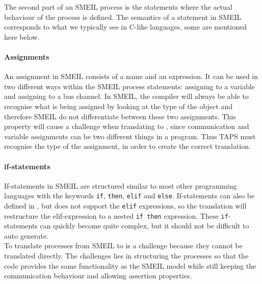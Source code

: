 The second part of an SMEIL process is the statements where the actual behaviour of the process is defined. The semantics of a statement in SMEIL corresponds to what we typically see in C-like languages, some are mentioned here below.
\paragraph{Assignments}
An assignment in SMEIL consists of a name and an expression. It can be used in two different ways within the SMEIL process statements: assigning to a variable and assigning to a bus channel. In SMEIL, the compiler will always be able to recognise what is being assigned by looking at the type of the object and therefore SMEIL do not differentiate between these two assignments. This property will cause a challenge when translating to \cspm{}, since communication and variable assignments can be two different things in a \cspm program. Thus TAPS must recognise the type of the assignment, in order to create the correct translation.
\paragraph{if-statements}
If-statements in SMEIL are structured similar to most other programming languages with the keywords \texttt{if}, \texttt{then}, \texttt{elif} and \texttt{else}. If-statements can also be defined in \cspm, but \cspm does not support the \texttt{elif} expressions, so the translation will restructure the elif-expression to a nested \texttt{if then} expression. These \texttt{if}-statements can quickly become quite complex, but it should not be difficult to auto generate.\\

To translate processes from SMEIL to \cspm{} is a challenge because they cannot be translated directly. The challenges lies in structuring the \cspm{} processes so that the \cspm{} code provides the same functionality as the SMEIL model while still keeping the \cspm{} communication behaviour and allowing assertion properties.
